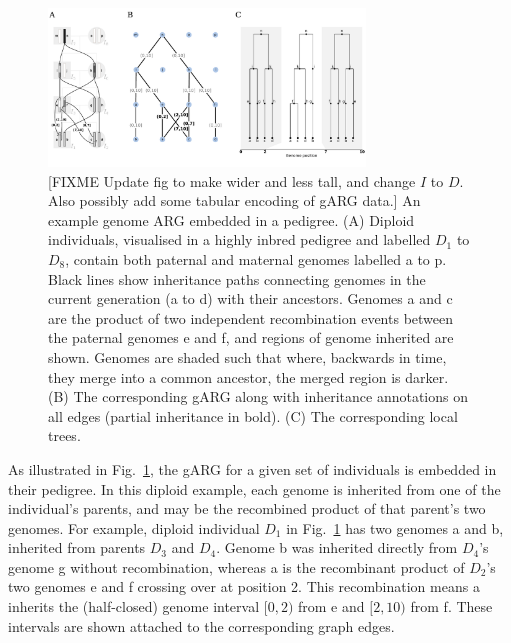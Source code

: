 \documentclass{article}
\newcommand{\noderef}[1]{\textsf{#1}}
\begin{document}
\begin{figure}
\begin{center}
    \includegraphics[width=0.75\textwidth]{illustrations/arg-in-pedigree}
\end{center}
\caption{\label{fig-arg-in-pedigree}
[FIXME Update fig to make wider and less tall, and change $I$ to $D$.
Also possibly add some tabular encoding of gARG data.]
An example genome ARG embedded in a pedigree.
(A) Diploid individuals, visualised in a highly inbred pedigree and
labelled $D_1$ to $D_8$,
contain both paternal and maternal  genomes
labelled \textsf{a} to \textsf{p}. Black lines show inheritance paths connecting
genomes in the current generation (\textsf{a} to \textsf{d}) with their ancestors.
Genomes \textsf{a} and \textsf{c} are the product of two independent
recombination events between
the paternal genomes \textsf{e}
and \textsf{f}, and regions of genome inherited are shown.
Genomes are shaded such that where, backwards in time,
they merge into a common ancestor, the merged region is darker.
(B) The corresponding gARG along with inheritance annotations on all edges
(partial inheritance in bold).
(C) The corresponding local trees.
}
\end{figure}

As illustrated in Fig.~\ref{fig-arg-in-pedigree},
the gARG for a given set of individuals is embedded in their pedigree.
In this diploid example, each genome is inherited from one
of the individual's parents,
and may be the recombined product of that parent's two genomes.
For example, diploid individual $D_1$ in Fig.~\ref{fig-arg-in-pedigree}
has two genomes \noderef{a} and \noderef{b},
inherited from parents $D_3$ and $D_4$.
Genome \noderef{b} was inherited directly from $D_4$'s genome \noderef{g} without
recombination, whereas
\noderef{a} is the recombinant product of
$D_2$'s two genomes \noderef{e} and \noderef{f} crossing over at position 2.
This recombination means \noderef{a} inherits the (half-closed) genome
interval $[0, 2)$ from \noderef{e} and $[2, 10)$ from \noderef{f}.
These intervals are shown attached to the corresponding graph edges.
\end{document}
